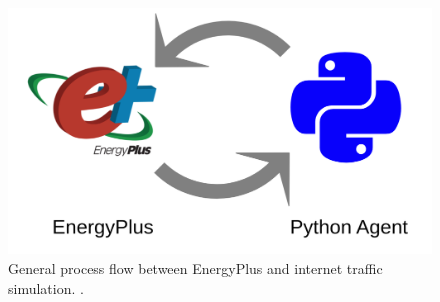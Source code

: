\begin{figure}[h]
\centering
    \includegraphics[scale=0.15]{traffic_profile/images/agent_bem.png}
    \caption[Software Agent and BEM Interaction]{General process flow between EnergyPlus and internet traffic simulation.  .}
\label{agent_bem}
\end{figure}